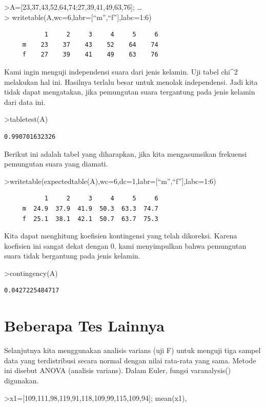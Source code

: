 \documentclass[
]{book}
\begin{document}
\textgreater A={[}23,37,43,52,64,74;27,39,41,49,63,76{]}; \ldots{}\\
\textgreater{} writetable(A,wc=6,labr={[}``m'',``f''{]},labc=1:6)

\begin{verbatim}
           1     2     3     4     5     6
     m    23    37    43    52    64    74
     f    27    39    41    49    63    76
\end{verbatim}

Kami ingin menguji independensi suara dari jenis kelamin. Uji tabel chi\^{}2 melakukan hal ini. Hasilnya terlalu besar untuk menolak independensi. Jadi kita tidak dapat mengatakan, jika pemungutan suara tergantung pada jenis kelamin dari data ini.

\textgreater tabletest(A)

\begin{verbatim}
0.990701632326
\end{verbatim}

Berikut ini adalah tabel yang diharapkan, jika kita mengasumsikan frekuensi pemungutan suara yang diamati.

\textgreater writetable(expectedtable(A),wc=6,dc=1,labr={[}``m'',``f''{]},labc=1:6)

\begin{verbatim}
           1     2     3     4     5     6
     m  24.9  37.9  41.9  50.3  63.3  74.7
     f  25.1  38.1  42.1  50.7  63.7  75.3
\end{verbatim}

Kita dapat menghitung koefisien kontingensi yang telah dikoreksi. Karena koefisien ini sangat dekat dengan 0, kami menyimpulkan bahwa pemungutan suara tidak bergantung pada jenis kelamin.

\textgreater contingency(A)

\begin{verbatim}
0.0427225484717
\end{verbatim}

\section{Beberapa Tes Lainnya}\label{beberapa-tes-lainnya}

Selanjutnya kita menggunakan analisis varians (uji F) untuk menguji tiga sampel data yang terdistribusi secara normal dengan nilai rata-rata yang sama. Metode ini disebut ANOVA (analisis varians). Dalam Euler, fungsi varanalysis() digunakan.

\textgreater x1={[}109,111,98,119,91,118,109,99,115,109,94{]}; mean(x1),
\end{document}
